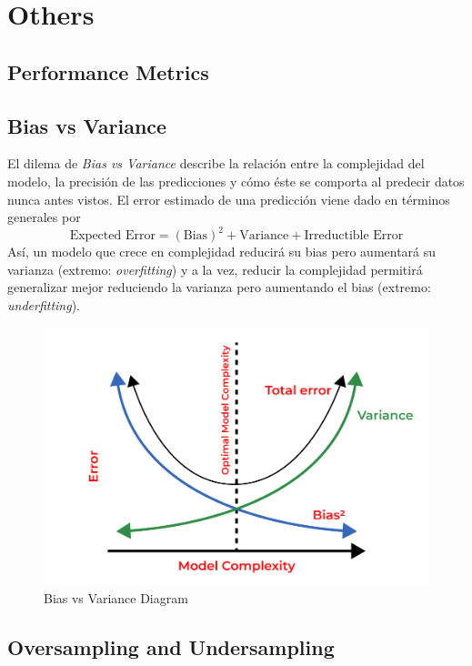 \section{Others}

\subsection{Performance Metrics} 

\subsection{Bias vs Variance}

El dilema de \textit{Bias vs Variance} describe la relación entre la complejidad del modelo, la precisión de las predicciones y cómo éste se comporta al predecir datos nunca antes vistos. El error estimado de una predicción viene dado en términos generales por 
$$
\text{Expected Error} = (\text{Bias})^2 + \text{Variance} + \text{Irreductible Error}
$$
Así, un modelo que crece en complejidad reducirá su bias pero aumentará su varianza (extremo: \textit{overfitting}) y a la vez, reducir la complejidad permitirá generalizar mejor reduciendo la varianza pero aumentando el bias (extremo: \textit{underfitting}). 

\begin{figure}[H]
    \center
    \includegraphics[scale=0.3]{notebooks/Others/img/bias_vs_variance.png}
    \caption{Bias vs Variance Diagram}
\end{figure}

\subsection{Oversampling and Undersampling}


